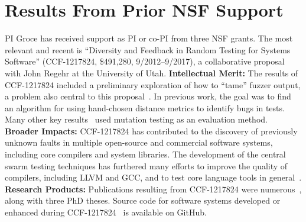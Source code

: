 \section{Results From Prior NSF Support}

PI Groce has received support as PI or co-PI from three NSF grants.
The most relevant and recent is ``Diversity and Feedback in Random
Testing for Systems Software'' (CCF-1217824,
\$491,280, 9/2012--9/2017), a collaborative proposal with John Regehr at the
University of Utah.
{\bf Intellectual Merit:} 
The results of CCF-1217824 included a preliminary exploration of how to
``tame'' fuzzer output, a problem also central to this proposal~\cite{PLDI13}.  In previous work, the goal was to find an algorithm
for using hand-chosen distance metrics to identify bugs in tests.
Many other key results~\cite{DirectedSwarm,issta14,helphelp,Onward14} used mutation testing as an
evaluation method.
{\bf Broader Impacts:} 
CCF-1217824 has contributed to the discovery of previously
unknown faults in multiple open-source and commercial software
systems, including core compilers and system libraries.  The
development of the central swarm testing techniques
has furthered many efforts to improve
the quality of compilers, including LLVM and GCC, and to test core language
tools in
general~\cite{ZhendongPLDI14,beginnerluck,dewey2015fuzzing,le2015randomized}. 
{\bf Research Products:}
Publications resulting from CCF-1217824 were numerous~\cite{Onward14,PLDI13,issta14,icst2014,helphelp,DirectedSwarm,stvrcausereduce,tstlsttt,ISSTA15,AlipourETAL16TestReduction,tstlsttt,NFM15},
along with three PhD theses.  Source code for software systems
developed or enhanced during CCF-1217824~\cite{swarmtools,TSTL}  is
available on GitHub.

